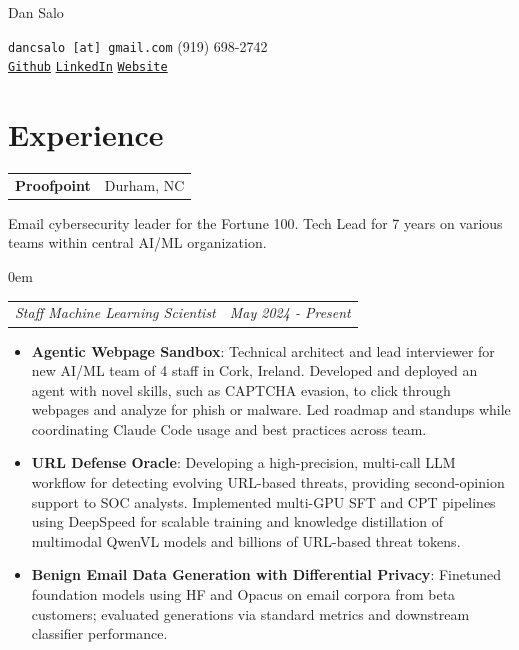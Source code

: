 \documentclass[letterpaper,11pt]{article}
\makeatletter
\newcommand{\resumeItem}[2]{
	\item\small{
		\textbf{#1}{: #2 \vspace{-2pt}}
	}
}
\newcommand{\resumeSubSubheading}[2]{
	\begin{addmargin}[1em]{0em}
		\begin{tabular*}{0.97\textwidth}{l@{\extracolsep{\fill}}r}
			\textit{#1} & \textit{\small #2} \\
		\end{tabular*}\vspace{-5pt}
	\end{addmargin}
}
\newcommand{\resumeItemListStart}{\begin{itemize}}
\newcommand{\resumeItemListEnd}{\end{itemize}\vspace{-5pt}}
\newcommand{\resumeJob}[3]{
	\vspace{3pt}
	\begin{tabular*}{0.97\textwidth}{l@{\extracolsep{\fill}}r}
		\textbf{#1} & #2 \\
	\end{tabular*}\vspace{4pt}
	\small{#3} \vspace{6pt}
}
\makeatother
\begin{document}
	
	\begin{minipage}[t][1cm][b]{0.3\textwidth}
		\hspace{-\hoffset}\raggedright \Huge {} Dan Salo \normalsize
	\end{minipage}
	\begin{minipage}[t][1cm][b]{0.69\textwidth}
		\footnotesize
		\raggedleft \texttt{dancsalo [at] gmail.com} \hspace{0.1cm}\textbullet \hspace{0.1cm} (919) 698-2742 \\ \texttt{\href{https://github.com/dancsalo}{Github}} \hspace{0.1cm}\textbullet \hspace{0.1cm} \texttt{\href{https://www.linkedin.com/in/dancsalo/}{LinkedIn}} \hspace{0.1cm}\textbullet \hspace{0.1cm}  \texttt{\href{https://dancsalo.github.io}{Website}}
	\end{minipage}
	
	\smallskip
	\smallskip
	\smallskip
	
	\section{Experience}
	\resumeJob{Proofpoint}{Durham, NC}{Email cybersecurity leader for the Fortune 100. Tech Lead for 7 years on various teams  within central AI/ML organization.}
	
	\resumeSubSubheading{Staff Machine Learning Scientist}{May 2024 - Present}
	\resumeItemListStart
	\resumeItem{Agentic Webpage Sandbox}
	{Technical architect and lead interviewer for new AI/ML team of 4 staff in Cork, Ireland. Developed and deployed an agent with novel skills, such as CAPTCHA evasion, to click through webpages and analyze for phish or malware. Led roadmap and standups while coordinating Claude Code usage and best practices across team.}
	
	\resumeItem{URL Defense Oracle}
	{Developing a high-precision, multi-call LLM workflow for detecting evolving URL-based threats, providing second-opinion support to SOC analysts. Implemented multi-GPU SFT and CPT pipelines using DeepSpeed for scalable training and knowledge distillation of multimodal QwenVL models and billions of URL-based threat tokens.}
	
	\resumeItem{Benign Email Data Generation with Differential Privacy}
	{Finetuned foundation models using HF and Opacus on email corpora from beta customers; evaluated generations via standard metrics and downstream classifier performance.}
	\resumeItemListEnd
	
\end{document}
